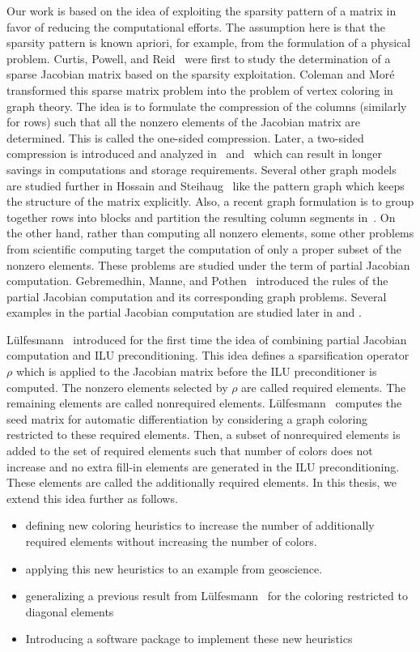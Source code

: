 \documentclass[12pt, twoside,a4paper,toc=bibliography]{scrbook}
\begin{document}
Our work is based on the idea of exploiting the sparsity pattern of a matrix in favor of
reducing the computational efforts. The assumption here is that the sparsity pattern is
known apriori, for example, from the formulation of a physical problem.
Curtis, Powell, and Reid~\cite{Curtis1974117} were first to study the determination of
a sparse Jacobian matrix based on the sparsity exploitation.
Coleman and Mor{\'e}~\cite{Coleman1983EoS} transformed this sparse matrix problem
into the problem of vertex coloring in graph theory. The idea is to formulate
the compression of the columns (similarly for rows) such that all the nonzero elements of the Jacobian matrix
are determined. This is called the one-sided compression.
Later, a two-sided compression is introduced and analyzed in~\cite{Coleman1996SaE}
and~\cite{hs:csj} which can result in longer savings in computations and storage requirements.
Several other graph models are studied further in Hossain and Steihaug~\cite{hs:gmei}
like the pattern graph which keeps the structure of the matrix explicitly.
Also, a recent graph formulation is to group together rows into blocks
and partition the resulting column segments in~\cite{optimal_diret_determination}.
On the other hand, rather than computing all nonzero elements,
some other problems from scientific computing target the computation
of only a proper subset of the nonzero elements.
These problems are studied under the term of partial Jacobian computation.
Gebremedhin, Manne, and Pothen~\cite{Gebremedhin05whatcolor} introduced
the rules of the partial Jacobian computation and its corresponding graph problems.
Several examples in the partial Jacobian computation are studied later in
\cite{CalotoiuMaster} and \cite{LulfesmannMaster}.

Lülfesmann~\cite{Lulfesmann2012Fap} introduced for the first time
the idea of combining partial Jacobian computation and ILU preconditioning.
This idea defines a sparsification operator $\rho$ which is applied to the Jacobian matrix
before the ILU preconditioner is computed. The nonzero elements selected by $\rho$
are called required elements. The remaining elements are called nonrequired elements.
Lülfesmann~\cite{Lulfesmann2012Fap} computes the seed matrix for automatic differentiation
by considering a graph coloring restricted to these required elements.
Then, a subset of nonrequired elements is added to the set of required elements
such that number of colors does not increase and no extra fill-in elements are generated
in the ILU preconditioning. These elements are called the additionally required elements.
In this thesis, we extend this idea further as follows.
\begin{itemize}
\item defining new coloring heuristics
to increase the number of additionally required elements without increasing the number of colors.
\item applying this new heuristics to an example from geoscience.
\item generalizing a previous result from Lülfesmann~\cite{Lulfesmann2012Fap} for the coloring restricted to diagonal elements
\item Introducing a software package to implement these new heuristics
\end{itemize}
\end{document}
